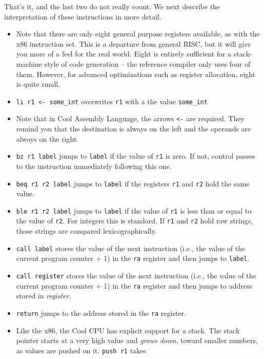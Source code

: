 \documentclass[]{article}
\begin{document}
That's it, and the last two do not really count. We next describe the
interpretation of these instructions in more detail.

\begin{itemize}
\itemsep1pt\parskip0pt
\item
  Note that there are only eight general purpose registers available, as
  with the x86 instruction set. This is a departure from general RISC,
  but it will give you more of a feel for the real world. Eight is
  entirely sufficient for a stack-machine style of code generation --
  the reference compiler only uses four of them. However, for advanced
  optimizations such as register allocation, eight is quite small.
\item
  \texttt{li r1 \textless{}- some\_int} overwrites \texttt{r1} with a
  the value \texttt{some\_int}
\item
  Note that in Cool Assembly Language, the arrows \texttt{\textless{}-}
  are required. They remind you that the destination is always on the
  left and the operands are always on the right.
\item
  \texttt{bz r1 label} jumps to \texttt{label} if the value of
  \texttt{r1} is zero. If not, control passes to the instruction
  immediately following this one.
\item
  \texttt{beq r1 r2 label} jumps to \texttt{label} if the registers
  \texttt{r1} and \texttt{r2} hold the same value.
\item
  \texttt{ble r1 r2 label} jumps to \texttt{label} if the value of
  \texttt{r1} is less than or equal to the value of \texttt{r2}. For
  integers this is standard. If \texttt{r1} and \texttt{r2} hold raw
  strings, those strings are compared lexicographically.
\item
  \texttt{call label} stores the value of the next instruction (i.e.,
  the value of the current program counter + 1) in the \texttt{ra}
  register and then jumps to \texttt{label}.
\item
  \texttt{call register} stores the value of the next instruction (i.e.,
  the value of the current program counter + 1) in the \texttt{ra}
  register and then jumps to address stored in \emph{register}.
\item
  \texttt{return} jumps to the address stored in the \texttt{ra}
  register.
\item
  Like the x86, the Cool CPU has explicit support for a stack. The stack
  pointer starts at a very high value and \emph{grows down}, toward
  smaller numbers, as values are pushed on it. \texttt{push r1} takes

\end{itemize}
\end{document}
